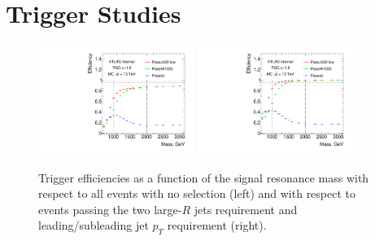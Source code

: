 \section{Trigger Studies} %
\label{app:trig}



\begin{figure}[htbp!]
\begin{center}
\includegraphics[width=0.45\textwidth,angle=-90]{figures/boosted/Trigger/app_trig_b77_Efficiency_PreSel.pdf}
\includegraphics[width=0.45\textwidth,angle=-90]{figures/boosted/Trigger/app_trig_b77_Efficiency_All.pdf}
  \caption{Trigger efficiencies as a function of the signal resonance mass with respect to all events with no selection (left) and with respect to events passing the two large-$R$ jets requirement and leading/subleading jet $p_{T}$ requirement (right). }
\label{fig:app-trig-eff-mass}
\end{center}
\end{figure}

